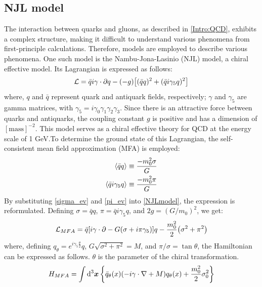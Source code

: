     \subsection{NJL model}
    \label{NJL model}      
        The interaction between quarks and gluons, as described in \ref{Intro:QCD}, exhibits a complex structure, making it difficult to understand various phenomena from first-principle calculations. Therefore, models are employed to describe various phenomena. One such model is the Nambu-Jona-Lasinio (NJL) model, a chiral effective model. Its Lagrangian is expressed as follows: 
        \begin{eqnarray}
            \label{NJLmodel}
            \mathcal{L}=\bar{q}i\gamma \cdot \partial q -(-g)\qty[(\bar{q}q)^2+(\bar{q}i\gamma_5q)^2]
        \end{eqnarray}  
        where, $q$ and $\bar{q}$ represent quark and antiquark fields, respectively; $\gamma$ and $\gamma_5$ are gamma matrices, with $\gamma_5 = i \gamma_0 \gamma_1 \gamma_2 \gamma_3$. Since there is an attractive force between quarks and antiquarks, the coupling constant $g$ is positive and has a dimension of $[\text{mass}]^{-2}$.  
        This model serves as a chiral effective theory for QCD at the energy scale of 1 GeV.\@ To determine the ground state of this Lagrangian, the self-consistent mean field approximation (MFA) is employed:  
        \begin{eqnarray}
            \label{sigma_ev}
            \ev{\bar{q}q}\equiv \frac{-m_0^2 \sigma}{G}\\
            \label{pi_ev}
            \ev{\bar{q}i\gamma_5q}\equiv \frac{-m_0^2 \pi}{G}
        \end{eqnarray}
        By substituting \eqref{sigma_ev} and \eqref{pi_ev} into \eqref{NJLmodel}, the expression is reformulated. Defining $\sigma = \bar{q}q$, $\pi = \bar{q} i \gamma_5 q$, and $2g = (G/m_0)^2$, we get:  
        \begin{eqnarray}
            \label{heikinbago}
            \mathcal{L}_{MFA} = \bar{q}\qty[i \gamma \cdot \partial - G(\sigma + i \pi \gamma_5)]q-\frac{m_0^2}{2}\qty(\sigma^2+\pi^2)
        \end{eqnarray}
        where, defining $q_\theta = e^{i \gamma_5 \frac{\theta}{2}} q$, $G \sqrt{\sigma^2 + \pi^2} = M$, and $\pi / \sigma = \tan{\theta}$, the Hamiltonian can be expressed as follows. $\theta$ is the parameter of the chiral transformation.  
        \begin{eqnarray}
            \label{ham}
            H_{MFA}=\int \dd[3]{\bm{x}}\qty{\bar{q}_\theta (x)(-i\gamma \cdot \nabla+M)q_{\theta}(x)+\frac{m_0^2}{2}\sigma_0^2}
        \end{eqnarray}
